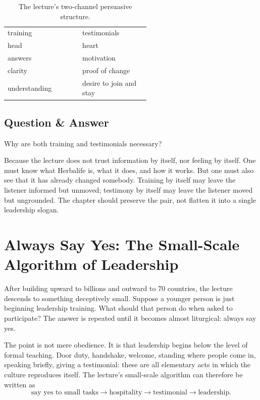 \begin{table}[h]
\centering
\begin{tabular}{p{0.28\linewidth} p{0.28\linewidth}}
training & testimonials \\
head & heart \\
answers & motivation \\
clarity & proof of change \\
understanding & desire to join and stay
\end{tabular}
\caption{The lecture's two-channel persuasive structure.}
\end{table}

\subsection{Question \& Answer}

Why are both training and testimonials necessary?

Because the lecture does not trust information by itself, nor feeling by itself. One must know what Herbalife is, what it does, and how it works. But one must also see that it has already changed somebody. Training by itself may leave the listener informed but unmoved; testimony by itself may leave the listener moved but ungrounded. The chapter should preserve the pair, not flatten it into a single leadership slogan.

\section{Always Say Yes: The Small-Scale Algorithm of Leadership}

After building upward to billions and outward to 70 countries, the lecture descends to something deceptively small. Suppose a younger person is just beginning leadership training. What should that person do when asked to participate? The answer is repeated until it becomes almost liturgical: always say yes.

The point is not mere obedience. It is that leadership begins below the level of formal teaching. Door duty, handshake, welcome, standing where people come in, speaking briefly, giving a testimonial: these are all elementary acts in which the culture reproduces itself. The lecture's small-scale algorithm can therefore be written as
\begin{equation}
\text{say yes to small tasks} \to \text{hospitality} \to \text{testimonial} \to \text{leadership}.
\end{equation}

